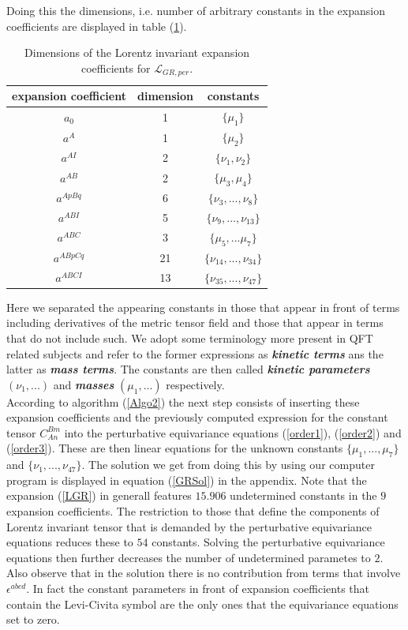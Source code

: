 \documentclass[a4paper,12pt, DIV=14, BCOR=5mm, twoside, headsepline]{scrbook}
\begin{document}
Doing this the dimensions, i.e. number of arbitrary constants in the expansion coefficients are displayed in table (\ref{GRExp}).
\begin{table}
\centering 
\begin{tabular}{c|c|c}
    expansion coefficient & dimension & constants   \\
    \hline 
    $a_0$ & 1 & $\{\mu_1\}$ \\
    $a^A$ & 1 & $\{\mu_2\}$ \\
    $a^{AI}$ & 2 & $\{\nu_1, \nu_2\}$ \\
    $a^{AB}$ & 2 & $\{\mu_3, \mu_4 \} $ \\
    $a^{ApBq}$ & 6 & $\{\nu_3,...,\nu_8\}$ \\
    $a^{ABI}$ & 5 & $\{ \nu_9,...,\nu_{13} \}$ \\
    $a^{ABC}$ & 3 & $\{ \mu_5,...\mu_7 \}$\\
    $a^{ABpCq}$ & 21 & $\{\nu_{14},...,\nu_{34} \}$ \\
    $a^{ABCI}$ & 13 & $\{ \nu_{35},...,\nu_{47}\}$
\end{tabular}
\caption{Dimensions of the Lorentz invariant expansion coefficients for $\mathcal{L}_{GR,per}$.}\label{GRExp}
\end{table}
Here we separated the appearing constants in those that appear in front of terms including derivatives of the metric tensor field and those that appear in terms that do not include such. We adopt some terminology more present in QFT related subjects and refer to the former expressions as \textbf{\textit{kinetic terms}} ans the latter as \textit{\textbf{mass terms}}. The constants are then called \textit{\textbf{kinetic parameters}} $(\nu_1,...)$ and \textit{\textbf{masses}} $(\mu_1,...)$ respectively.   \\

According to algorithm (\ref{Algo2}) the next step consists of inserting these expansion coefficients and the previously computed expression for the constant tensor $C_{An}^{Bm}$ into the perturbative equivariance equations (\ref{order1}), (\ref{order2}) and (\ref{order3}). These are then linear equations for the unknown constants $\{ \mu_1,...,\mu_7\}$ and $\{\nu_1,...,\nu_{47}\}$. The solution we get from doing this by using our computer program is displayed in equation (\ref{GRSol}) in the appendix. Note that the expansion (\ref{LGR}) in generall features $15.906$ undetermined constants in the $9$ expansion coefficients. The restriction to those that define the components of Lorentz invariant tensor that is demanded by the perturbative equivariance equations reduces these to $54$ constants. Solving the perturbative equivariance equations then further decreases the number of undetermined parametes to $2$. Also observe that in the solution there is no contribution from terms that involve $\epsilon^{abcd}$. In fact the constant parameters in front of expansion coefficients that contain the Levi-Civita symbol are the only ones that the equivariance equations set to zero. \\
\end{document}
